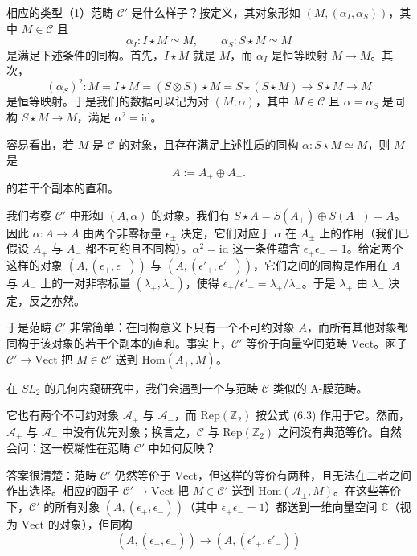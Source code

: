 \documentclass[11pt,a4paper]{article}
\begin{document}
相应的类型（1）范畴 $\mathcal{C}'$ 是什么样子？按定义，其对象形如 $(M,(\alpha_I,\alpha_S))$，其中 $M\in\mathcal{C}$ 且
\[
\alpha_I : I\star M\simeq M,\qquad \alpha_S : S\star M\simeq M
\]
是满足下述条件的同构。首先，$I\star M$ 就是 $M$，而 $\alpha_I$ 是恒等映射 $M\to M$。其次，
\[
(\alpha_S)^2 : M = I\star M = (S\otimes S)\star M = S\star(S\star M)\to S\star M\to M
\]
是恒等映射。于是我们的数据可以记为对 $(M,\alpha)$，其中 $M\in\mathcal{C}$ 且 $\alpha = \alpha_S$ 是同构 $S\star M\to M$，满足 $\alpha^2 = \mathrm{id}$。

容易看出，若 $M$ 是 $\mathcal{C}$ 的对象，且存在满足上述性质的同构 $\alpha : S\star M\simeq M$，则 $M$ 是
\[
A := A_+\oplus A_-.
\]
的若干个副本的直和。

我们考察 $\mathcal{C}'$ 中形如 $(A,\alpha)$ 的对象。我们有 $S\star A = S(A_+)\oplus S(A_-) = A$。因此 $\alpha : A\to A$ 由两个非零标量 $\epsilon_\pm$ 决定，它们对应于 $\alpha$ 在 $A_\pm$ 上的作用（我们已假设 $A_+$ 与 $A_-$ 都不可约且不同构）。$\alpha^2 = \mathrm{id}$ 这一条件蕴含 $\epsilon_+\epsilon_- = 1$。给定两个这样的对象 $(A,(\epsilon_+,\epsilon_-))$ 与 $(A,(\epsilon'_+,\epsilon'_-))$，它们之间的同构是作用在 $A_+$ 与 $A_-$ 上的一对非零标量 $(\lambda_+,\lambda_-)$，使得 $\epsilon_+/\epsilon'_+ = \lambda_+/\lambda_-$。于是 $\lambda_+$ 由 $\lambda_-$ 决定，反之亦然。

于是范畴 $\mathcal{C}'$ 非常简单：在同构意义下只有一个不可约对象 $A$，而所有其他对象都同构于该对象的若干个副本的直和。事实上，$\mathcal{C}'$ 等价于向量空间范畴 $\mathrm{Vect}$。函子 $\mathcal{C}'\to\mathrm{Vect}$ 把 $M\in\mathcal{C}'$ 送到 $\mathrm{Hom}(A_+,M)$。

在 $SL_2$ 的几何内窥研究中，我们会遇到一个与范畴 $\mathcal{C}$ 类似的 A-膜范畴。


它也有两个不可约对象 $\mathcal{A}_+$ 与 $\mathcal{A}_-$，而 $\mathrm{Rep}(\mathbb{Z}_2)$ 按公式 (6.3) 作用于它。然而，$\mathcal{A}_+$ 与 $\mathcal{A}_-$ 中没有优先对象；换言之，$\mathcal{C}$ 与 $\mathrm{Rep}(\mathbb{Z}_2)$ 之间没有典范等价。自然会问：这一模糊性在范畴 $\mathcal{C}'$ 中如何反映？

答案很清楚：范畴 $\mathcal{C}'$ 仍然等价于 $\mathrm{Vect}$，但这样的等价有两种，且无法在二者之间作出选择。相应的函子 $\mathcal{C}'\to\mathrm{Vect}$ 把 $M\in\mathcal{C}'$ 送到 $\mathrm{Hom}(\mathcal{A}_\pm,M)$。在这些等价下，$\mathcal{C}'$ 的所有对象 $(A,(\epsilon_+,\epsilon_-))$（其中 $\epsilon_+\epsilon_- = 1$）都送到一维向量空间 $\mathbb{C}$（视为 $\mathrm{Vect}$ 的对象），但同构
\[
(A,(\epsilon_+,\epsilon_-))\to(A,(\epsilon'_+,\epsilon'_-))
\]
\end{document}
